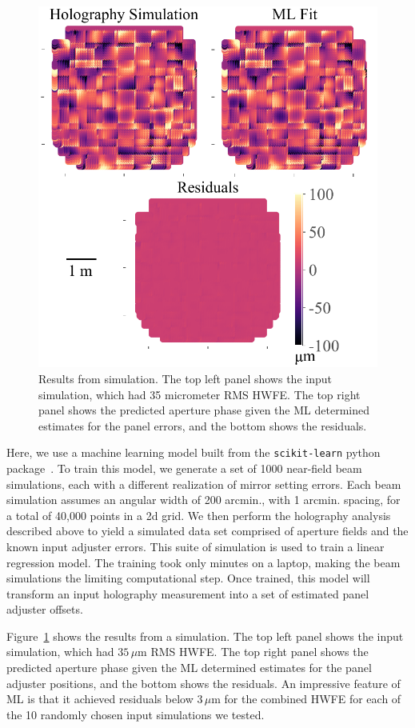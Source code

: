 \begin{figure}[t]
    \centering
    \includegraphics[width=.8\textwidth]{Figures/ap_length_corrected_single_pannel3.pdf}
    \caption{Results from simulation.  The top left panel shows the input simulation, which had 35 micrometer RMS HWFE.  The top right panel shows the predicted aperture phase given the ML determined estimates for the panel errors, and the bottom shows the residuals.}
    \label{fig:ap_resids}
\end{figure}
Here, we use a machine learning model built from the \verb|scikit-learn| python package~\cite{scikit}. To train this model, we generate a set of 1000 near-field beam simulations, each with a different realization of mirror setting errors.  Each beam simulation assumes an angular width of 200 arcmin., with 1 arcmin. spacing, for a total of 40,000 points in a 2d grid.  We then perform the holography analysis described above to yield a simulated data set comprised of aperture fields and the known input adjuster errors.  This suite of simulation is used to train a linear regression model.  The training took only minutes on a laptop, making the beam simulations the limiting computational step.  Once trained, this model will transform an input holography measurement into a set of estimated panel adjuster offsets.

Figure~\ref{fig:ap_resids} shows the results from a simulation.  The top left panel shows the input simulation, which had $35\,\mu$m RMS HWFE.  The top right panel shows the predicted aperture phase given the ML determined estimates for the panel adjuster positions, and the bottom shows the residuals.  An impressive feature of ML is that it achieved residuals below $3\,\mu$m for the combined HWFE for each of the 10 randomly chosen input simulations we tested.

